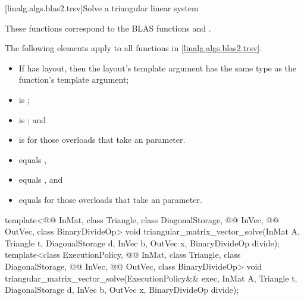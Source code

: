[linalg.algs.blas2.trsv]{Solve a triangular linear system}

\pnum
\begin{note}
These functions correspond to the BLAS functions
 and \supercite{blas2}.
\end{note}

\pnum
The following elements apply to all functions in \ref{linalg.algs.blas2.trsv}.

\pnum
\mandates
\begin{itemize}
\item
If  has  layout,
then the layout's  template argument has
the same type as the function's  template argument;
\item
{}
is ;
\item
{}
is ; and
\item
{}
is  for those overloads that take an  parameter.
\end{itemize}

\pnum
\expects
\begin{itemize}
\item
{} equals ,
\item
{} equals , and
\item
{} equals 
for those overloads that take an  parameter.
\end{itemize}

%
\begin{itemdecl}
  template<@@ InMat, class Triangle, class DiagonalStorage,
           @@ InVec, @@ OutVec, class BinaryDivideOp>
    void triangular_matrix_vector_solve(InMat A, Triangle t, DiagonalStorage d,
                                        InVec b, OutVec x, BinaryDivideOp divide);
  template<class ExecutionPolicy, @@ InMat, class Triangle, class DiagonalStorage,
           @@ InVec, @@ OutVec, class BinaryDivideOp>
    void triangular_matrix_vector_solve(ExecutionPolicy&& exec,
                                        InMat A, Triangle t, DiagonalStorage d,
                                        InVec b, OutVec x, BinaryDivideOp divide);
\end{itemdecl}

